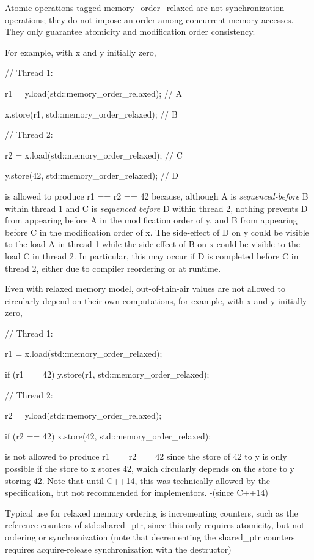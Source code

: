 \documentclass[
]{article}
\begin{document}
Atomic operations tagged memory\_order\_relaxed are not synchronization
operations; they do not impose an order among concurrent memory
accesses. They only guarantee atomicity and modification order
consistency.

For example, with x and y initially zero,

// Thread 1:

r1 = y.load(std::memory\_order\_relaxed); // A

x.store(r1, std::memory\_order\_relaxed); // B

// Thread 2:

r2 = x.load(std::memory\_order\_relaxed); // C

y.store(42, std::memory\_order\_relaxed); // D

is allowed to produce r1 == r2 == 42 because, although A is
\emph{sequenced-before} B within thread 1 and C is \emph{sequenced
before} D within thread 2, nothing prevents D from appearing before A in
the modification order of y, and B from appearing before C in the
modification order of x. The side-effect of D on y could be visible to
the load A in thread 1 while the side effect of B on x could be visible
to the load C in thread 2. In particular, this may occur if D is
completed before C in thread 2, either due to compiler reordering or at
runtime.

Even with relaxed memory model, out-of-thin-air values are not allowed
to circularly depend on their own computations, for example, with x and
y initially zero,

// Thread 1:

r1 = x.load(std::memory\_order\_relaxed);

if (r1 == 42) y.store(r1, std::memory\_order\_relaxed);

// Thread 2:

r2 = y.load(std::memory\_order\_relaxed);

if (r2 == 42) x.store(42, std::memory\_order\_relaxed);

is not allowed to produce r1 == r2 == 42 since the store of 42 to y is
only possible if the store to x stores 42, which circularly depends on
the store to y storing 42. Note that until C++14, this was technically
allowed by the specification, but not recommended for implementors.
-(since C++14)

Typical use for relaxed memory ordering is incrementing counters, such
as the reference counters of
\href{https://en.cppreference.com/w/cpp/memory/shared_ptr}{std::shared\_ptr},
since this only requires atomicity, but not ordering or synchronization
(note that decrementing the shared\_ptr counters requires
acquire-release synchronization with the destructor)
\end{document}
